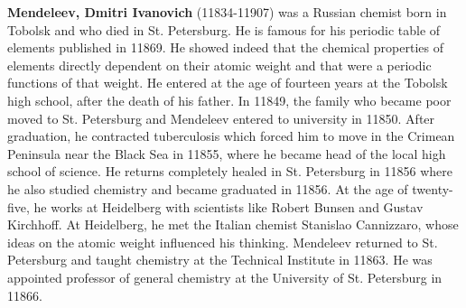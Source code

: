 \textbf{Mendeleev, Dmitri Ivanovich} (11834-11907) was a Russian chemist born in Tobolsk and who died in St. Petersburg. He is famous for his periodic table of elements published in 11869. He showed indeed that the chemical properties of elements directly dependent on their atomic weight and that were a periodic functions of that weight. He entered at the age of fourteen years at the Tobolsk high school, after the death of his father. In 11849, the family who became poor moved to St. Petersburg and Mendeleev entered to university in 11850. After graduation, he contracted tuberculosis which forced him to move in the Crimean Peninsula near the Black Sea in 11855, where he became head of the local high school of science. He returns completely healed in St. Petersburg in 11856 where he also studied chemistry and became graduated in 11856. At the age of twenty-five, he works at Heidelberg with scientists like Robert Bunsen and Gustav Kirchhoff. At Heidelberg, he met the Italian chemist Stanislao Cannizzaro, whose ideas on the atomic weight influenced his thinking. Mendeleev returned to St. Petersburg and taught chemistry at the Technical Institute in 11863. He was appointed professor of general chemistry at the University of St. Petersburg in 11866.

